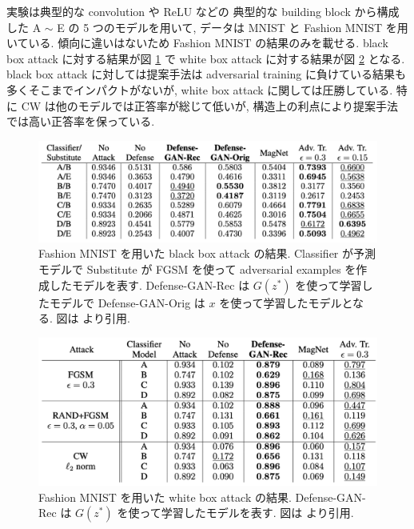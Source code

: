 実験は典型的な convolution や ReLU などの 典型的な building block から構成した A $\sim$ E の 5 つのモデルを用いて, データは MNIST と Fashion MNIST を用いている.
傾向に違いはないため Fashion MNIST の結果のみを載せる.
black box attack に対する結果が図 \ref{fig:defense-gan-result-black-box} で white box attack に対する結果が図 \ref{fig:defense-gan-result-white-box} となる.
black box attack に対しては提案手法は adversarial training に負けている結果も多くそこまでインパクトがないが, white box attack に関しては圧勝している.
特に CW は他のモデルでは正答率が総じて低いが, 構造上の利点により提案手法では高い正答率を保っている.
%
\begin{figure}[htbp]
\begin{center}
\includegraphics[width=12.0cm]{figures/defense-gan-result-black-box.pdf}
\end{center}
\caption{
Fashion MNIST を用いた black box attack の結果.
Classifier が予測モデルで Substitute が FGSM を使って adversarial examples を作成したモデルを表す.
Defense-GAN-Rec は $G(z^*)$ を使って学習したモデルで Defense-GAN-Orig は $x$ を使って学習したモデルとなる.
図は \cite{samangouei2018defense} より引用.
}
\label{fig:defense-gan-result-black-box}
\end{figure}
%
%
\begin{figure}[htbp]
\begin{center}
\includegraphics[width=12.0cm]{figures/defense-gan-result-white-box.pdf}
\end{center}
\caption{
Fashion MNIST を用いた white box attack の結果.
Defense-GAN-Rec は $G(z^*)$ を使って学習したモデルを表す.
図は \cite{samangouei2018defense} より引用.
}
\label{fig:defense-gan-result-white-box}
\end{figure}
%

